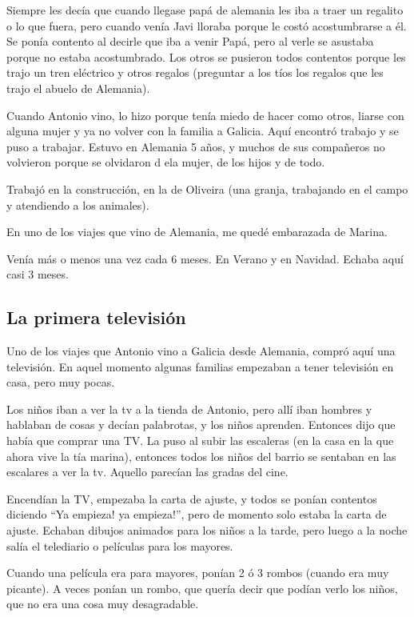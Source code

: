 \documentclass[12pt,a5paper]{book}
\begin{document}
Siempre les decía que cuando llegase papá de alemania les iba a traer un regalito o lo que fuera, pero cuando venía Javi lloraba porque le costó acostumbrarse a él. Se ponía contento al decirle que iba a venir Papá, pero al verle se asustaba porque no estaba acostumbrado. Los otros se pusieron todos contentos porque les trajo un tren eléctrico y otros regalos (preguntar a los tíos los regalos que les trajo el abuelo de Alemania). 

Cuando Antonio vino, lo hizo porque tenía miedo de hacer como otros, liarse con alguna mujer y ya no volver con la familia a Galicia. Aquí encontró trabajo y se puso a trabajar. Estuvo en Alemania 5 años, y muchos de sus compañeros no volvieron porque se olvidaron d ela mujer, de los hijos y de todo.

Trabajó en la construcción, en la de Oliveira (una granja, trabajando en el campo y atendiendo a los animales).

En uno de los viajes que vino de Alemania, me quedé embarazada de Marina.

Venía más o menos una vez cada 6 meses. En Verano y en Navidad. Echaba aquí casi 3 meses.


\subsection*{La primera televisión}

Uno de los viajes que Antonio vino a Galicia desde Alemania, compró aquí una televisión. En aquel momento algunas familias empezaban a tener televisión en casa, pero muy pocas.

Los niños iban a ver la tv a la tienda de Antonio, pero allí iban hombres y hablaban de cosas y decían palabrotas, y los niños aprenden. Entonces dijo que había que comprar una TV. La puso al subir las escaleras (en la casa en la que ahora vive la tía marina), entonces todos los niños del barrio  se sentaban en las escalares a ver la tv. Aquello parecían las gradas del cine. 

Encendían la TV, empezaba la carta de ajuste, y todos se ponían contentos diciendo “Ya empieza! ya empieza!”, pero de momento solo estaba la carta de ajuste. Echaban dibujos animados para los niños a la tarde, pero luego a la noche salía el telediario o películas para los mayores.

Cuando una película era para mayores, ponían 2 ó 3 rombos (cuando era muy picante). A veces ponían un rombo, que quería decir que podían verlo los niños, que no era una cosa muy desagradable.
\end{document}
